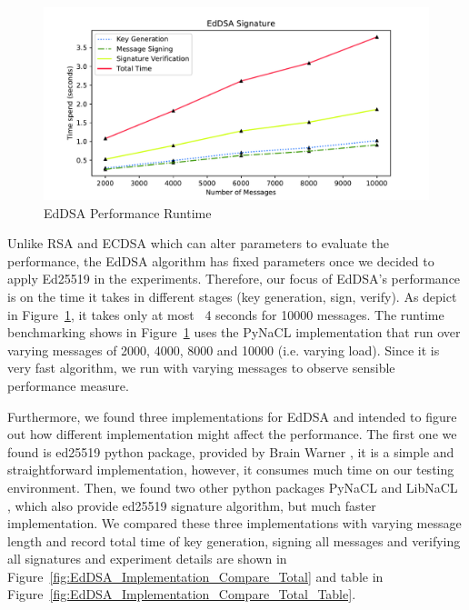 \documentclass[10pt,sigconf]{acmart}
\begin{document}
\begin{figure}[H]
\centering
\includegraphics[scale=0.45]{EdDSA_Performance_Runtime}
\caption{\small{EdDSA Performance Runtime}}
\label{fig:EdDSA_Performance_Runtime}
\end{figure}

Unlike RSA and ECDSA which can alter parameters to evaluate the performance, the EdDSA algorithm has fixed parameters once we decided to apply Ed25519 in the experiments. Therefore, our focus of EdDSA's performance is on the time it takes in different stages (key generation, sign, verify). As depict in Figure~\ref{fig:EdDSA_Performance_Runtime}, it takes only at most ~4 seconds for 10000 messages. The runtime benchmarking shows in Figure~\ref{fig:EdDSA_Performance_Runtime} uses the PyNaCL \cite{PyNaCl} implementation that run over varying messages of 2000, 4000, 8000 and 10000 (i.e. varying load).  Since it is very fast algorithm, we run with varying messages to observe sensible performance measure.

Furthermore, we found three implementations for EdDSA and intended to figure out how different implementation might affect the performance. The first one we found is ed25519 python package, provided by Brain Warner \cite{BrianWarner}, it is a simple and straightforward implementation, however, it consumes much time on our testing environment. Then, we found two other python packages PyNaCL \cite{PyNaCl} and LibNaCL \cite{libnacl}, which also provide ed25519 signature algorithm, but much faster implementation. We compared these three implementations with varying message length and record total time of key generation, signing all messages and verifying all signatures and experiment details are shown in Figure~\ref{fig:EdDSA_Implementation_Compare_Total} and table in Figure~\ref{fig:EdDSA_Implementation_Compare_Total_Table}.
\end{document}
